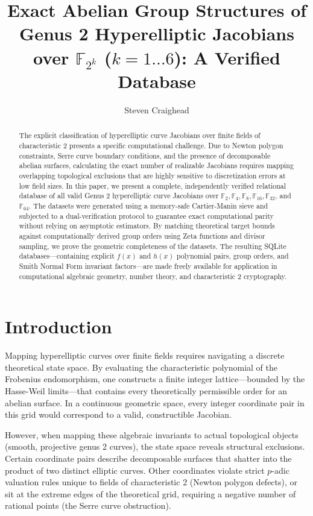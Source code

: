 \documentclass[12pt]{article}
\title{Exact Abelian Group Structures of Genus 2 Hyperelliptic Jacobians over $\mathbb{F}_{2^k}$ ($k=1 \dots 6$): A Verified Database}
\author{Steven Craighead}
\date{}
\begin{document}
\maketitle

\begin{abstract}
The explicit classification of hyperelliptic curve Jacobians over finite fields of characteristic 2 presents a specific computational challenge. Due to Newton polygon constraints, Serre curve boundary conditions, and the presence of decomposable abelian surfaces, calculating the exact number of realizable Jacobians requires mapping overlapping topological exclusions that are highly sensitive to discretization errors at low field sizes. In this paper, we present a complete, independently verified relational database of all valid Genus 2 hyperelliptic curve Jacobians over $\mathbb{F}_2, \mathbb{F}_4, \mathbb{F}_8, \mathbb{F}_{16}, \mathbb{F}_{32}$, and $\mathbb{F}_{64}$. The datasets were generated using a memory-safe Cartier-Manin sieve and subjected to a dual-verification protocol to guarantee exact computational parity without relying on asymptotic estimators. By matching theoretical target bounds against computationally derived group orders using Zeta functions and divisor sampling, we prove the geometric completeness of the datasets. The resulting SQLite databases---containing explicit $f(x)$ and $h(x)$ polynomial pairs, group orders, and Smith Normal Form invariant factors---are made freely available for application in computational algebraic geometry, number theory, and characteristic 2 cryptography.
\end{abstract}

\section{Introduction}
Mapping hyperelliptic curves over finite fields requires navigating a discrete theoretical state space. By evaluating the characteristic polynomial of the Frobenius endomorphism, one constructs a finite integer lattice---bounded by the Hasse-Weil limits---that contains every theoretically permissible order for an abelian surface. In a continuous geometric space, every integer coordinate pair in this grid would correspond to a valid, constructible Jacobian.

However, when mapping these algebraic invariants to actual topological objects (smooth, projective genus 2 curves), the state space reveals structural exclusions. Certain coordinate pairs describe decomposable surfaces that shatter into the product of two distinct elliptic curves. Other coordinates violate strict $p$-adic valuation rules unique to fields of characteristic 2 (Newton polygon defects), or sit at the extreme edges of the theoretical grid, requiring a negative number of rational points (the Serre curve obstruction).
\end{document}
